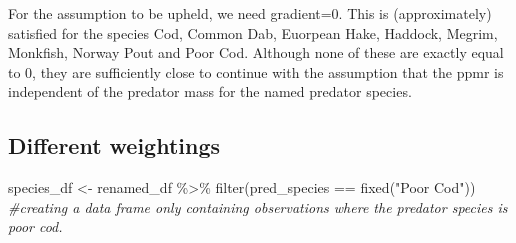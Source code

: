 \documentclass[
]{article}
\newenvironment{Shaded}{\begin{snugshade}}{\end{snugshade}}
\newcommand{\CommentTok}[1]{\textcolor[rgb]{0.56,0.35,0.01}{\textit{#1}}}
\newcommand{\FunctionTok}[1]{\textcolor[rgb]{0.00,0.00,0.00}{#1}}
\newcommand{\NormalTok}[1]{#1}
\newcommand{\OtherTok}[1]{\textcolor[rgb]{0.56,0.35,0.01}{#1}}
\newcommand{\SpecialCharTok}[1]{\textcolor[rgb]{0.00,0.00,0.00}{#1}}
\newcommand{\StringTok}[1]{\textcolor[rgb]{0.31,0.60,0.02}{#1}}
\begin{document}
For the assumption to be upheld, we need gradient=0. This is
(approximately) satisfied for the species Cod, Common Dab, Euorpean
Hake, Haddock, Megrim, Monkfish, Norway Pout and Poor Cod. Although none
of these are exactly equal to 0, they are sufficiently close to continue
with the assumption that the ppmr is independent of the predator mass
for the named predator species.

\hypertarget{different-weightings}{%
\subsection{Different weightings}\label{different-weightings}}

\begin{Shaded}
\begin{Highlighting}[]
\NormalTok{species\_df }\OtherTok{\textless{}{-}}\NormalTok{ renamed\_df }\SpecialCharTok{\%\textgreater{}\%} \FunctionTok{filter}\NormalTok{(pred\_species }\SpecialCharTok{==} \FunctionTok{fixed}\NormalTok{(}\StringTok{"Poor Cod"}\NormalTok{))}
\CommentTok{\#creating a data frame only containing observations where the predator species is poor cod.}


\end{Highlighting}
\end{Shaded}
\end{document}
